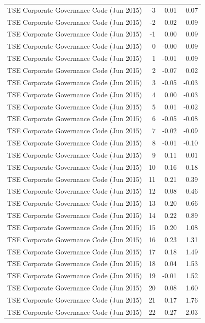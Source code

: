 \begin{table}
\begin{tabular}{lrrr}
TSE Corporate Governance Code (Jun 2015) & -3 & 0.01 & 0.07 \\
TSE Corporate Governance Code (Jun 2015) & -2 & 0.02 & 0.09 \\
TSE Corporate Governance Code (Jun 2015) & -1 & 0.00 & 0.09 \\
TSE Corporate Governance Code (Jun 2015) & 0 & -0.00 & 0.09 \\
TSE Corporate Governance Code (Jun 2015) & 1 & -0.01 & 0.09 \\
TSE Corporate Governance Code (Jun 2015) & 2 & -0.07 & 0.02 \\
TSE Corporate Governance Code (Jun 2015) & 3 & -0.05 & -0.03 \\
TSE Corporate Governance Code (Jun 2015) & 4 & 0.00 & -0.03 \\
TSE Corporate Governance Code (Jun 2015) & 5 & 0.01 & -0.02 \\
TSE Corporate Governance Code (Jun 2015) & 6 & -0.05 & -0.08 \\
TSE Corporate Governance Code (Jun 2015) & 7 & -0.02 & -0.09 \\
TSE Corporate Governance Code (Jun 2015) & 8 & -0.01 & -0.10 \\
TSE Corporate Governance Code (Jun 2015) & 9 & 0.11 & 0.01 \\
TSE Corporate Governance Code (Jun 2015) & 10 & 0.16 & 0.18 \\
TSE Corporate Governance Code (Jun 2015) & 11 & 0.21 & 0.39 \\
TSE Corporate Governance Code (Jun 2015) & 12 & 0.08 & 0.46 \\
TSE Corporate Governance Code (Jun 2015) & 13 & 0.20 & 0.66 \\
TSE Corporate Governance Code (Jun 2015) & 14 & 0.22 & 0.89 \\
TSE Corporate Governance Code (Jun 2015) & 15 & 0.20 & 1.08 \\
TSE Corporate Governance Code (Jun 2015) & 16 & 0.23 & 1.31 \\
TSE Corporate Governance Code (Jun 2015) & 17 & 0.18 & 1.49 \\
TSE Corporate Governance Code (Jun 2015) & 18 & 0.04 & 1.53 \\
TSE Corporate Governance Code (Jun 2015) & 19 & -0.01 & 1.52 \\
TSE Corporate Governance Code (Jun 2015) & 20 & 0.08 & 1.60 \\
TSE Corporate Governance Code (Jun 2015) & 21 & 0.17 & 1.76 \\
TSE Corporate Governance Code (Jun 2015) & 22 & 0.27 & 2.03 \\

\end{tabular}
\end{table}
